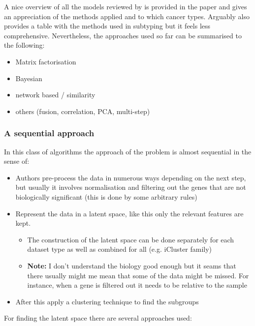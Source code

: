 A nice overview of all the models reviewed by \citet{Menyhart2021-ef} is provided in the paper and gives an appreciation of the methods applied and to which cancer types. Arguably \citet{Subramanian2020-tk} also provides a table with the methods used in subtyping but it feels less comprehensive. Nevertheless, the approaches used so far can be summarised to the following:
\begin{itemize}
    \item Matrix factorisation
    \item Bayesian
    \item network based / similarity 
    \item others (fusion, correlation, PCA, multi-step)
\end{itemize}

\subsubsection{A sequential approach}

In this class of algorithms the approach of the problem is almost sequential in the sense of:

\begin{itemize}
    \item Authors pre-process the data in numerous ways depending on the next step, but usually it involves normalisation and filtering out the genes that are not biologically significant (this is done by some arbitrary rules)
    
    \item Represent the data in a latent space, like this only the relevant features are kept. 
    \begin{itemize}
        \item The construction of the latent space can be done separately for each dataset type as well as combined for all (e.g. iCluster family)
        \item \textbf{Note:} I don't understand the biology good enough but it seams that there usually might me mean that some of the data might be missed. For instance, when a gene is filtered out it needs to be relative to the sample
    \end{itemize}
    
    \item After this apply a clustering technique to find the subgroups
\end{itemize}

For finding the latent space there are several approaches used:

